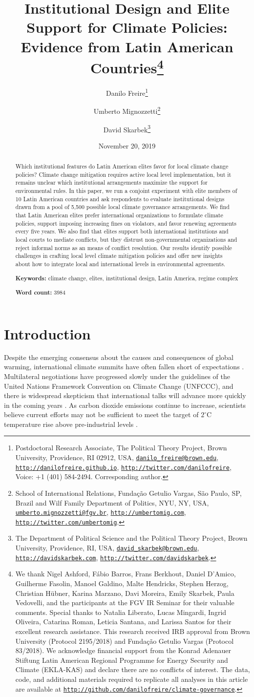 \documentclass[a4paper,12pt]{article}
\title{Institutional Design and Elite Support for Climate Policies: Evidence from Latin American Countries\thanks{We thank Nigel Ashford, F\'{a}bio Barros, Frans Berkhout, Daniel D'Amico, Guilherme Fasolin, Manoel Galdino, Malte Hendricks, Stephen Herzog, Christian H\"{u}bner, Karina Marzano, Davi Moreira, Emily Skarbek, Paula Vedovelli, and the participants at the FGV IR Seminar for their valuable comments. Special thanks to Natalia Liberato, Lucas Mingardi, Ingrid Oliveira, Catarina Roman, Leticia Santana, and Larissa Santos for their excellent research assistance. This research received IRB approval from Brown University (Protocol 2195/2018) and Funda\c{c}\~{a}o Getulio Vargas (Protocol 83/2018). We acknowledge financial support from the Konrad Adenauer Stiftung Latin American Regional Programme for Energy Security and Climate (EKLA-KAS) and declare there are no conflicts of interest. The data, code, and additional materials required to replicate all analyses in this article are available at \href{http://github.com/danilofreire/climate-governance}{\texttt{http://github.com/danilofreire/climate-governance}}.}}
\author{Danilo Freire\thanks{Postdoctoral Research Associate, The Political Theory Project, Brown University, Providence, RI 02912, USA, \href{mailto:danilo_freire@brown.edu}{\texttt{danilo\_freire@brown.edu}}, \href{http://danilofreire.github.io}{\texttt{http://danilofreire.github.io}}, \href{http://twitter.com/danilofreire}{\texttt{http://twitter.com/danilofreire}}, Voice: +1 (401) 584-2494. Corresponding author.}
\and Umberto Mignozzetti\thanks{School of International Relations, Funda\c{c}\~{a}o Getulio Vargas, S\~{a}o Paulo, SP, Brazil and Wilf Family Department of Politics, NYU, NY, USA, \href{mailto:umberto.mignozzetti@fgv.br}{\texttt{umberto.mignozzetti@fgv.br}}, \href{http://umbertomig.com}{\texttt{http://umbertomig.com}}, \href{http://twitter.com/umbertomig}{\texttt{http://twitter.com/umbertomig}}.}
\and David Skarbek\thanks{The Department of Political Science and the Political Theory Project, Brown University, Providence, RI, USA, \href{mailto:david_skarbek@brown.edu}{\texttt{david\_skarbek@brown.edu}}, \href{http://davidskarbek.com}{\texttt{http://davidskarbek.com}}, \href{http://twitter.com/davidskarbek}{\texttt{http://twitter.com/davidskarbek}}.}}
\date{November 20, 2019}
\begin{document}
\maketitle

\begin{abstract}
\onehalfspacing
\noindent 
Which institutional features do Latin American elites favor for local climate change policies? Climate change mitigation requires active local level implementation, but it remains unclear which institutional arrangements maximize the support for environmental rules. In this paper, we run a conjoint experiment with elite members of 10 Latin American countries and ask respondents to evaluate institutional designs drawn from a pool of 5,500 possible local climate governance arrangements. We find that Latin American elites prefer international organizations to formulate climate policies, support imposing increasing fines on violators, and favor renewing agreements every five years. We also find that elites support both international institutions and local courts to mediate conflicts, but they distrust non-governmental organizations and reject informal norms as an means of conflict resolution. Our results identify possible challenges in crafting local level climate mitigation policies and offer new insights about how to integrate local and international levels in environmental agreements.

\vspace{.5cm}

\noindent 
\textbf{Keywords:} climate change, elites, institutional design, Latin America, regime complex

\vspace{.5cm}

\noindent 
\textbf{Word count:} 3984
\end{abstract}

\newpage

\doublespacing

\section{Introduction}%
\label{sec:introduction}

Despite the emerging consensus about the causes and consequences of global warming, international climate summits have often fallen short of expectations \citep{rogelj2010copenhagen, rosen2015wrong, victor2017prove}. Multilateral negotiations have progressed slowly under the guidelines of the United Nations Framework Convention on Climate Change (UNFCCC), and there is widespread skepticism that international talks will advance more quickly in the coming years \citep{cole2015advantages, hjerpe2015views}. As carbon dioxide emissions continue to increase, scientists believe current efforts may not be sufficient to meet the target of $2^{\circ}$C temperature rise above pre-industrial levels \citep{jordan2015emergence}.
\end{document}

